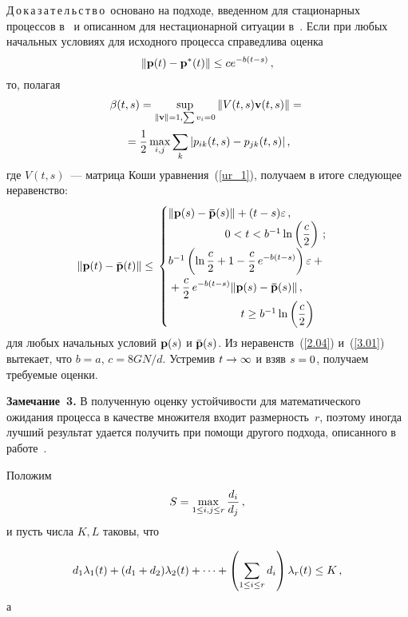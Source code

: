 \begin{multicols}{2}
\smallskip

\noindent
Д\,о\,к\,а\,з\,а\,т\,е\,л\,ь\,с\,т\,в\,о\ основано на подходе, 
введенном для стационарных процессов в~\cite{mit03} и описанном для нестационарной 
ситуации в~\cite{z11}.
Если  при любых начальных условиях для исходного процесса справедлива оценка
\begin{equation*} 
\|{\mathbf p}(t) - {\mathbf p}^*(t)\| \le ce^{-b\left(t-s\right)}\,,
\end{equation*}
то, полагая
\begin{multline*}
\beta (t, s)=\sup\limits_{ \| {\bf v} \| =1, \sum {v_i}=0}
{\|V(t,s){\bf v}(t,s)\|} ={}\\
{}= \displaystyle\frac{\displaystyle 1\mathstrut}{\displaystyle 2\mathstrut} \max_{i,j} \sum\limits_k {|p_{ik}(t,
s)-p_{jk}(t, s)|}\,, 
\end{multline*}
где $V(t, s)$~--- матрица Коши
уравнения~(\ref{ur_1}), получаем в итоге следующее неравенство:
\begin{equation*}
\|{\bf p}(t)-\bar{\bf p}(t)\| \le{}
\begin{cases}
\|{\bf p}(s)-{\bf \bar{p}}(s)\|+ (t-s)\varepsilon \,, &\\
&\hspace*{-35mm} 0<t< b^{-1} \ln \left(\fr{c}{2}\right)\,; \\
b^{-1}\left(\ln \fr{c}{2} +1-\fr{c}{2}\,e^{-b(t-s)}\right)\varepsilon +{}&\\
{}+
\fr{c}{2}\,e^{-b(t-s)} \|{\bf p}(s)-{\bf \bar{p}}(s)\|\,, &\\
&\hspace*{-30mm}t\ge b^{-1}\ln \left(\fr{c}{2}\right)
\end{cases}
\end{equation*}
для любых начальных условий ${\bf p}(s)$ и $\bar{\bf p}(s)$.
Из неравенств~(\ref{2.04}) и~(\ref{3.01}) вытекает, что $b=a$, $c={8GN}/{d}$.  
Устремив $t \hm\to \infty$ и взяв $s\hm=0$, получаем требуемые оценки.


\smallskip

\noindent
\textbf{Замечание~3.} 
В полученную оценку устойчивости для математического ожидания процесса 
в качестве множителя входит размерность~$r$, поэтому иногда лучший результат 
удается получить при помощи другого подхода, описанного в работе~\cite{z11}.

\smallskip

Положим 
$$
S=\max\limits_{{1 \le i, j \le r}} \displaystyle\frac{\displaystyle d_i\mathstrut}{\displaystyle d_j\mathstrut}\,,
$$ 
и пусть числа $K, L$ таковы, что 

\noindent
$$
d_1\lambda_1(t) + (d_1+d_2)\lambda_2(t) + \dots + 
\left(\sum\limits_{1 \le i \le r}d_i\right) \lambda_r(t) \le K\,,
$$ 
а 


\end{multicols}
